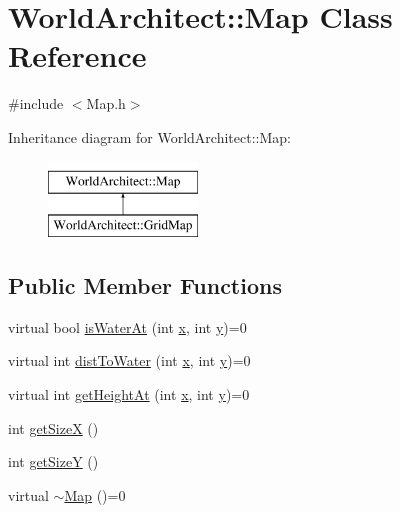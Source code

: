 \hypertarget{class_world_architect_1_1_map}{}\section{World\+Architect\+::Map Class Reference}
\label{class_world_architect_1_1_map}


{\ttfamily \#include $<$Map.\+h$>$}

Inheritance diagram for World\+Architect\+::Map\+:\begin{figure}[H]
\begin{center}
\leavevmode
\includegraphics[height=2.000000cm]{class_world_architect_1_1_map}
\end{center}
\end{figure}
\subsection*{Public Member Functions}
\begin{DoxyCompactItemize}
\item 
virtual bool \mbox{\hyperlink{class_world_architect_1_1_map_a9bc642e73c611d59d5185c7973c8bd09}{is\+Water\+At}} (int \mbox{\hyperlink{class_world_architect_1_1_map_a1b4cf9200dca11577b4567584a1e62b8}{x}}, int \mbox{\hyperlink{class_world_architect_1_1_map_abd1e160bb8b03587caac4fb508c13307}{y}})=0
\item 
virtual int \mbox{\hyperlink{class_world_architect_1_1_map_aeb09ef48c0b9cb0e0ff33b9ca4842829}{dist\+To\+Water}} (int \mbox{\hyperlink{class_world_architect_1_1_map_a1b4cf9200dca11577b4567584a1e62b8}{x}}, int \mbox{\hyperlink{class_world_architect_1_1_map_abd1e160bb8b03587caac4fb508c13307}{y}})=0
\item 
virtual int \mbox{\hyperlink{class_world_architect_1_1_map_ac2f33a10a0d3136515552c171d138ef2}{get\+Height\+At}} (int \mbox{\hyperlink{class_world_architect_1_1_map_a1b4cf9200dca11577b4567584a1e62b8}{x}}, int \mbox{\hyperlink{class_world_architect_1_1_map_abd1e160bb8b03587caac4fb508c13307}{y}})=0
\item 
int \mbox{\hyperlink{class_world_architect_1_1_map_a6742f753cca8c5bbc84e81187723b753}{get\+SizeX}} ()
\item 
int \mbox{\hyperlink{class_world_architect_1_1_map_ae26053131c967d9732e64f27c0765c65}{get\+SizeY}} ()
\item 
virtual \mbox{\hyperlink{class_world_architect_1_1_map_add0f5f3c2af54df264d4d257814a58a3}{$\sim$\+Map}} ()=0
\end{DoxyCompactItemize}
